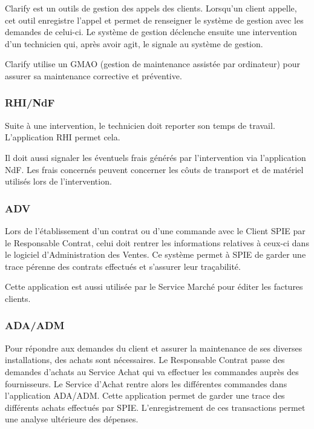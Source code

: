 Clarify est un outils de gestion des appels des clients.
Lorsqu'un client appelle, cet outil enregistre l'appel et permet de renseigner le système de gestion avec les demandes de celui-ci.
Le système de gestion déclenche ensuite une intervention d'un technicien qui, après avoir agit, le signale au système de gestion.

Clarify utilise un GMAO (gestion de maintenance assistée par ordinateur) pour assurer sa maintenance corrective et préventive.


\subsubsection{RHI/NdF}

Suite à une intervention, le technicien doit reporter son temps de travail. L'application RHI permet cela.

Il doit aussi signaler les éventuels frais générés par l'intervention via l'application NdF.
Les frais concernés peuvent concerner les côuts de transport et de matériel utilisés lors de l'intervention.

\subsubsection{ADV}

Lors de l'établissement d'un contrat ou d'une commande avec le Client SPIE par le Responsable Contrat, celui doit rentrer les informations relatives à ceux-ci dans le logiciel d'Administration des Ventes.
Ce système permet à SPIE de garder une trace pérenne des contrats effectués et s'assurer leur traçabilité.

Cette application est aussi utilisée par le Service Marché pour éditer les factures clients.

\subsubsection{ADA/ADM}

Pour répondre aux demandes du client et assurer la maintenance de ses diverses installations, des achats sont nécessaires.
Le Responsable Contrat passe des demandes d'achats au Service Achat qui va effectuer les commandes auprès des fournisseurs.
Le Service d'Achat rentre alors les différentes commandes dans l'application ADA/ADM\@.
Cette application permet de garder une trace des différents achats effectués par SPIE\@.
L'enregistrement de ces transactions permet une analyse ultérieure des dépenses.

